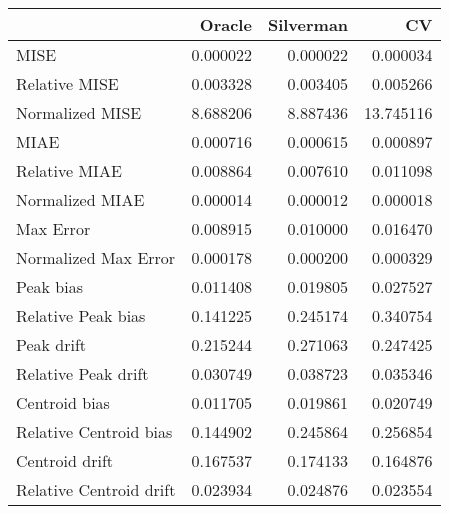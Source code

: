 \begin{tabular}{lrrr}
  \hline
 & Oracle & Silverman & CV \\ 
  \hline
MISE & 0.000022 & 0.000022 & 0.000034 \\ 
  Relative MISE & 0.003328 & 0.003405 & 0.005266 \\ 
  Normalized MISE & 8.688206 & 8.887436 & 13.745116 \\ 
  MIAE & 0.000716 & 0.000615 & 0.000897 \\ 
  Relative MIAE & 0.008864 & 0.007610 & 0.011098 \\ 
  Normalized MIAE & 0.000014 & 0.000012 & 0.000018 \\ 
  Max Error & 0.008915 & 0.010000 & 0.016470 \\ 
  Normalized Max Error & 0.000178 & 0.000200 & 0.000329 \\ 
  Peak bias & 0.011408 & 0.019805 & 0.027527 \\ 
  Relative Peak bias & 0.141225 & 0.245174 & 0.340754 \\ 
  Peak drift & 0.215244 & 0.271063 & 0.247425 \\ 
  Relative Peak drift & 0.030749 & 0.038723 & 0.035346 \\ 
  Centroid bias & 0.011705 & 0.019861 & 0.020749 \\ 
  Relative Centroid bias & 0.144902 & 0.245864 & 0.256854 \\ 
  Centroid drift & 0.167537 & 0.174133 & 0.164876 \\ 
  Relative Centroid drift & 0.023934 & 0.024876 & 0.023554 \\ 
   \hline
\end{tabular}
